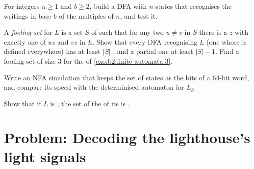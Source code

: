 \begin{exercise}[$\star\star$]\label{exo:b2:finite-automata:9}
For integers $n \ge 1$ and $b \ge 2$, build a DFA with $n$ states that recognises the writings in base $b$ of the
multiples of $n$, and test it.
\end{exercise}

\begin{exercise}[$\star\star\star$]\label{exo:b2:finite-automata:10}
A \emph{fooling set} for $L$ is a set $S$ of  such that for any two $u \ne v$ in $S$ there is a  $z$ with
exactly one of $uz$ and $vz$ in $L$. Show that every  DFA recognising $L$ (one whose  is defined everywhere) has at
least $|S|$ , and a partial one at least $|S| - 1$. Find a
fooling set of size 3 for the  of \cref{exo:b2:finite-automata:3}.
\end{exercise}

\begin{exercise}[$\star\star\star$]\label{exo:b2:finite-automata:11}
Write an NFA simulation that keeps the set of states as the bits of a 64-bit word, and compare its speed with the
determinised automaton for $L_k$.
\end{exercise}

\begin{exercise}[$\star\star\star$]\label{exo:b2:finite-automata:12}
Show that if $L$ is , the set of the  of its  is .
\end{exercise}

\section{Problem: Decoding the lighthouse's light signals}\label{sec:b2:finite-automata:problem}

